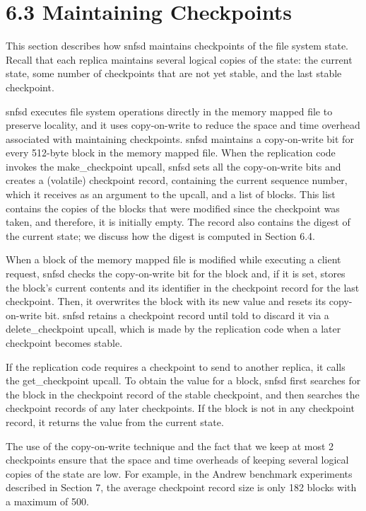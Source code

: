 \documentclass[
]{article}
\begin{document}
\section{6.3 Maintaining Checkpoints}\label{maintaining-checkpoints}

This section describes how snfsd maintains checkpoints of the file
system state. Recall that each replica maintains several logical copies
of the state: the current state, some number of checkpoints that are not
yet stable, and the last stable checkpoint.

snfsd executes file system operations directly in the memory mapped file
to preserve locality, and it uses copy-on-write to reduce the space and
time overhead associated with maintaining checkpoints. snfsd maintains a
copy-on-write bit for every 512-byte block in the memory mapped file.
When the replication code invokes the make\_checkpoint upcall, snfsd
sets all the copy-on-write bits and creates a (volatile) checkpoint
record, containing the current sequence number, which it receives as an
argument to the upcall, and a list of blocks. This list contains the
copies of the blocks that were modified since the checkpoint was taken,
and therefore, it is initially empty. The record also contains the
digest of the current state; we discuss how the digest is computed in
Section 6.4.

When a block of the memory mapped file is modified while executing a
client request, snfsd checks the copy-on-write bit for the block and, if
it is set, stores the block's current contents and its identifier in the
checkpoint record for the last checkpoint. Then, it overwrites the block
with its new value and resets its copy-on-write bit. snfsd retains a
checkpoint record until told to discard it via a delete\_checkpoint
upcall, which is made by the replication code when a later checkpoint
becomes stable.

If the replication code requires a checkpoint to send to another
replica, it calls the get\_checkpoint upcall. To obtain the value for a
block, snfsd first searches for the block in the checkpoint record of
the stable checkpoint, and then searches the checkpoint records of any
later checkpoints. If the block is not in any checkpoint record, it
returns the value from the current state.

The use of the copy-on-write technique and the fact that we keep at most
2 checkpoints ensure that the space and time overheads of keeping
several logical copies of the state are low. For example, in the Andrew
benchmark experiments described in Section 7, the average checkpoint
record size is only 182 blocks with a maximum of 500.
\end{document}
